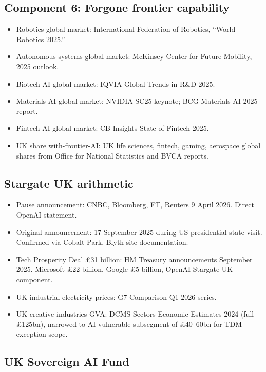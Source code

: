 \documentclass[11pt,letterpaper]{article}
\theoremstyle{remark}
\begin{document}
\subsection{Component 6: Forgone frontier capability}

\begin{itemize}
\item Robotics global market: International Federation of Robotics, ``World Robotics 2025.''
\item Autonomous systems global market: McKinsey Center for Future Mobility, 2025 outlook.
\item Biotech-AI global market: IQVIA Global Trends in R\&D 2025.
\item Materials AI global market: NVIDIA SC25 keynote; BCG Materials AI 2025 report.
\item Fintech-AI global market: CB Insights State of Fintech 2025.
\item UK share with-frontier-AI: UK life sciences, fintech, gaming, aerospace global shares from Office for National Statistics and BVCA reports.
\end{itemize}

\subsection{Stargate UK arithmetic}

\begin{itemize}
\item Pause announcement: CNBC, Bloomberg, FT, Reuters 9 April 2026. Direct OpenAI statement.
\item Original announcement: 17 September 2025 during US presidential state visit. Confirmed via Cobalt Park, Blyth site documentation.
\item Tech Prosperity Deal £31 billion: HM Treasury announcements September 2025. Microsoft £22 billion, Google £5 billion, OpenAI Stargate UK component.
\item UK industrial electricity prices: \citet{iea_2026} G7 Comparison Q1 2026 series.
\item UK creative industries GVA: DCMS Sectors Economic Estimates 2024 (full \pounds125bn), narrowed to AI-vulnerable subsegment of \pounds40--60bn for TDM exception scope.
\end{itemize}

\subsection{UK Sovereign AI Fund}
\end{document}
